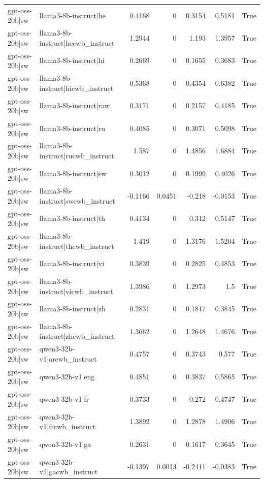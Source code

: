 \begin{table}
\begin{tabular}{l l r r r r l}
gpt-oss-20b|sw & llama3-8b-instruct|he & 0.4168 & 0 & 0.3154 & 0.5181 & True \\
gpt-oss-20b|sw & llama3-8b-instruct|hecwb_instruct & 1.2944 & 0 & 1.193 & 1.3957 & True \\
gpt-oss-20b|sw & llama3-8b-instruct|hi & 0.2669 & 0 & 0.1655 & 0.3683 & True \\
gpt-oss-20b|sw & llama3-8b-instruct|hicwb_instruct & 0.5368 & 0 & 0.4354 & 0.6382 & True \\
gpt-oss-20b|sw & llama3-8b-instruct|raw & 0.3171 & 0 & 0.2157 & 0.4185 & True \\
gpt-oss-20b|sw & llama3-8b-instruct|ru & 0.4085 & 0 & 0.3071 & 0.5098 & True \\
gpt-oss-20b|sw & llama3-8b-instruct|rucwb_instruct & 1.587 & 0 & 1.4856 & 1.6884 & True \\
gpt-oss-20b|sw & llama3-8b-instruct|sw & 0.3012 & 0 & 0.1999 & 0.4026 & True \\
gpt-oss-20b|sw & llama3-8b-instruct|swcwb_instruct & -0.1166 & 0.0451 & -0.218 & -0.0153 & True \\
gpt-oss-20b|sw & llama3-8b-instruct|th & 0.4134 & 0 & 0.312 & 0.5147 & True \\
gpt-oss-20b|sw & llama3-8b-instruct|thcwb_instruct & 1.419 & 0 & 1.3176 & 1.5204 & True \\
gpt-oss-20b|sw & llama3-8b-instruct|vi & 0.3839 & 0 & 0.2825 & 0.4853 & True \\
gpt-oss-20b|sw & llama3-8b-instruct|vicwb_instruct & 1.3986 & 0 & 1.2973 & 1.5 & True \\
gpt-oss-20b|sw & llama3-8b-instruct|zh & 0.2831 & 0 & 0.1817 & 0.3845 & True \\
gpt-oss-20b|sw & llama3-8b-instruct|zhcwb_instruct & 1.3662 & 0 & 1.2648 & 1.4676 & True \\
gpt-oss-20b|sw & qwen3-32b-v1|arcwb_instruct & 0.4757 & 0 & 0.3743 & 0.577 & True \\
gpt-oss-20b|sw & qwen3-32b-v1|eng & 0.4851 & 0 & 0.3837 & 0.5865 & True \\
gpt-oss-20b|sw & qwen3-32b-v1|fr & 0.3733 & 0 & 0.272 & 0.4747 & True \\
gpt-oss-20b|sw & qwen3-32b-v1|frcwb_instruct & 1.3892 & 0 & 1.2878 & 1.4906 & True \\
gpt-oss-20b|sw & qwen3-32b-v1|ga & 0.2631 & 0 & 0.1617 & 0.3645 & True \\
gpt-oss-20b|sw & qwen3-32b-v1|gacwb_instruct & -0.1397 & 0.0013 & -0.2411 & -0.0383 & True \\

\end{tabular}
\end{table}
